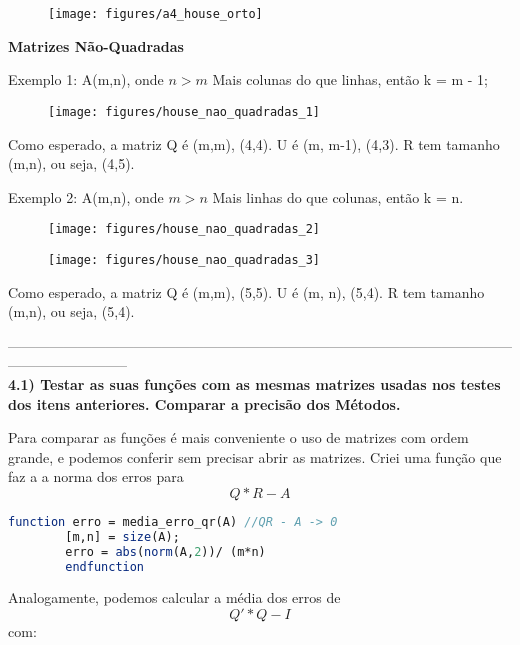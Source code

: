 \documentclass[leqno]{article}
\numberwithin{equation}{section}
\begin{document}
	\begin{figure}[H]
		\centering
		\texttt{[image: figures/a4\_house\_orto]}		
	\end{figure}

	\newpage
	\noindent \textbf{{\large Matrizes Não-Quadradas}}
	
	Exemplo 1: A(m,n), onde $n > m$ Mais colunas do que linhas, então k = m - 1;
	
	\begin{figure}[H]
		\centering
		\texttt{[image: figures/house\_nao\_quadradas\_1]}		
	\end{figure}
	
	Como esperado, a matriz Q é (m,m), (4,4). U é (m, m-1), (4,3). R tem tamanho (m,n), ou seja, (4,5).
	
	Exemplo 2: A(m,n), onde $m > n$ Mais linhas do que colunas, então k = n.
	
	\begin{figure}[H]
		\centering
		\texttt{[image: figures/house\_nao\_quadradas\_2]}		
	\end{figure}

	\begin{figure}[H]
		\centering
		\texttt{[image: figures/house\_nao\_quadradas\_3]}		
	\end{figure}
	
	Como esperado, a matriz Q é (m,m), (5,5). U é (m, n), (5,4). R tem tamanho (m,n), ou seja, (5,4).
	
	--------------------------------------------------------------------------------------------------------------------------------------\\

	\noindent \textbf{{\large 4.1) Testar as suas funções com as mesmas matrizes usadas nos testes dos itens
	anteriores. Comparar a precisão dos Métodos.}}
	
	
	
	Para comparar as funções é mais conveniente o uso de matrizes com ordem grande, e podemos conferir sem precisar abrir as matrizes. Criei uma função que faz a a norma dos erros para $$Q*R - A$$
	
	\begin{lstlisting}[style=mystyle, language=Scilab]
		function erro = media_erro_qr(A) //QR - A -> 0
		[m,n] = size(A);
		erro = abs(norm(A,2))/ (m*n)
		endfunction
	\end{lstlisting}
	
	Analogamente, podemos calcular a média dos erros de $$Q'*Q - I$$ com:
	
\end{document}
